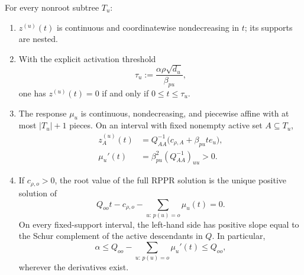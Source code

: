\begin{theorem}
\label{thm:tree-response}
For every nonroot subtree $T_u$:
\begin{enumerate}[label=(\roman*),leftmargin=*]
 \item $z^{(u)}(t)$ is continuous and coordinatewise nondecreasing in $t$;
 its supports are nested.
 \item With the explicit activation threshold
 \begin{equation}
  \tau_u
  :=\frac{\alpha\rho\sqrt{d_u}}{\beta_{pu}},
  \label{eq:subtree-activation-threshold}
 \end{equation}
 one has $z^{(u)}(t)=0$ if and only if $0\leq t\leq\tau_u$.
 \item The response $\mu_u$ is continuous, nondecreasing, and piecewise
 affine with at most $|T_u|+1$ pieces.  On an interval with fixed nonempty
 active set $A\subseteq T_u$,
 \begin{align}
  z_A^{(u)}(t)
  &=Q_{AA}^{-1}
    \bigl(c_{\rho,A}+\beta_{pu}t e_u\bigr),
  \label{eq:tree-affine-piece}\\
  \mu_u'(t)
  &=\beta_{pu}^2(Q_{AA}^{-1})_{uu}>0.
  \label{eq:tree-response-slope}
 \end{align}
 \item If $c_{\rho,o}>0$, the root value of the full RPPR solution is the
 unique positive solution of
 \begin{equation}
  Q_{oo}t-c_{\rho,o}
  -\sum_{u:\,p(u)=o}\mu_u(t)=0.
  \label{eq:root-response-equation}
 \end{equation}
 On every fixed-support interval, the left-hand side has positive slope equal
 to the Schur complement of the active descendants in $Q$.  In particular,
 \begin{equation}
  \alpha
  \leq Q_{oo}-\sum_{u:\,p(u)=o}\mu_u'(t)
  \leq Q_{oo},
  \label{eq:root-response-slope-bound}
 \end{equation}
 wherever the derivatives exist.
\end{enumerate}
\end{theorem}

